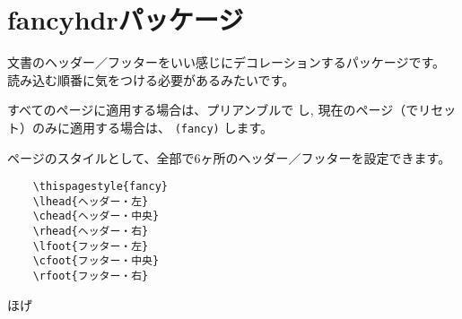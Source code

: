 \section{fancyhdrパッケージ}

\pagestyle{fancy}
\cfoot{-\, \thepage \, -}

文書のヘッダー／フッターをいい感じにデコレーションするパッケージです。
読み込む順番に気をつける必要があるみたいです。

すべてのページに適用する場合は、プリアンブルで
\texttt{\pagestyle{fancy}}し,
現在のページ（\texttt{\newpage}でリセット）のみに適用する場合は、
\texttt{\thispagestyle(fancy)}
します。

ページのスタイルとして、全部で6ヶ所のヘッダー／フッターを設定できます。

\begin{verbatim}
    \thispagestyle{fancy}
    \lhead{ヘッダー・左}
    \chead{ヘッダー・中央}
    \rhead{ヘッダー・右}
    \lfoot{フッター・左}
    \cfoot{フッター・中央}
    \rfoot{フッター・右}
\end{verbatim}

ほげ
